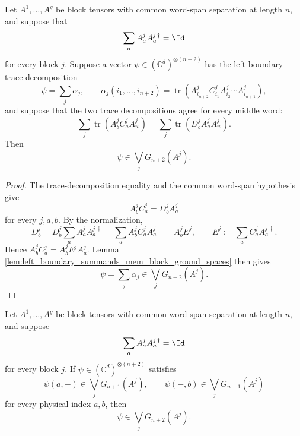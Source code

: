 \begin{lemma}
    \label{lem:left_boundary_trace_decomposition_mem_block_ground_spaces}
    \leanok
    Let \(A^1,\ldots,A^g\) be block tensors with common word-span separation at
    length \(n\), and suppose that
    \[
        \sum_a A^j_a A^{j\,\dagger}_a=\Id
    \]
    for every block \(j\).  Suppose a vector \(\psi\in(\mathbb C^d)^{\otimes(n+2)}\)
    has the left-boundary trace decomposition
    \[
        \psi=\sum_j\alpha_j,
        \qquad
        \alpha_j(i_1,\ldots,i_{n+2})
        =
        \operatorname{tr}\!\left(
        A^j_{i_{n+2}} C^j_{i_1}
        A^j_{i_2}\cdots A^j_{i_{n+1}}
        \right),
    \]
    and suppose that the two trace decompositions agree for every middle word:
    \[
        \sum_j
        \operatorname{tr}\!\left(
        A^j_b C^j_a A^j_w
        \right)
        =
        \sum_j
        \operatorname{tr}\!\left(
        D^j_b A^j_a A^j_w
        \right).
    \]
    Then
    \[
        \psi\in\bigvee_j G_{n+2}(A^j).
    \]
\end{lemma}

\begin{proof}
    \leanok
    The trace-decomposition equality and the common word-span hypothesis give
    \[
        A^j_bC^j_a=D^j_bA^j_a
    \]
    for every \(j,a,b\).  By the normalization,
    \[
        D^j_b
        =
        D^j_b\sum_a A^j_aA^{j\,\dagger}_a
        =
        \sum_a A^j_bC^j_aA^{j\,\dagger}_a
        =
        A^j_bE^j,
        \qquad
        E^j:=\sum_a C^j_aA^{j\,\dagger}_a.
    \]
    Hence \(A^j_bC^j_a=A^j_bE^jA^j_a\).  Lemma
    \ref{lem:left_boundary_summands_mem_block_ground_spaces} then gives
    \[
        \psi=\sum_j\alpha_j\in\bigvee_j G_{n+2}(A^j).
    \]
\end{proof}

\begin{lemma}
    \label{lem:block_restrictions_mem_block_ground_spaces}
    \leanok
    Let \(A^1,\ldots,A^g\) be block tensors with common word-span separation at
    length \(n\), and suppose
    \[
        \sum_a A^j_aA^{j\,\dagger}_a=\Id
    \]
    for every block \(j\).  If \(\psi\in(\mathbb C^d)^{\otimes(n+2)}\) satisfies
    \[
        \psi(a,-)\in\bigvee_jG_{n+1}(A^j),
        \qquad
        \psi(-,b)\in\bigvee_jG_{n+1}(A^j)
    \]
    for every physical index \(a,b\), then
    \[
        \psi\in\bigvee_jG_{n+2}(A^j).
    \]
\end{lemma}

